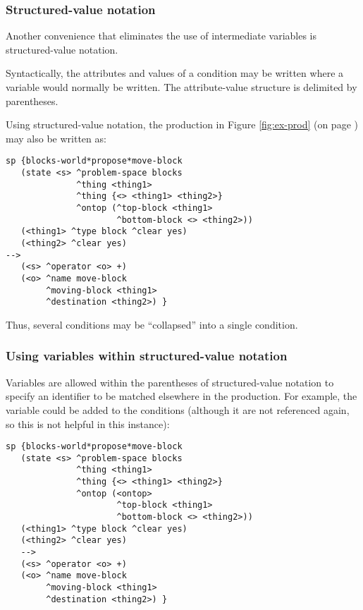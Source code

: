 \subsubsection{Structured-value notation}
\label{SYNTAX-pm-structured}    %

Another convenience that eliminates the use of intermediate variables is 
structured-value notation. 

Syntactically, the attributes and values of a condition may be written where a
variable would normally be written. The attribute-value structure is delimited
by parentheses.

Using structured-value notation, the production in Figure \ref{fig:ex-prod}
(on page \pageref{fig:ex-prod}) may also be written as:

\begin{verbatim}
sp {blocks-world*propose*move-block
   (state <s> ^problem-space blocks
              ^thing <thing1> 
              ^thing {<> <thing1> <thing2>}
              ^ontop (^top-block <thing1>
                      ^bottom-block <> <thing2>))
   (<thing1> ^type block ^clear yes)
   (<thing2> ^clear yes)
-->
   (<s> ^operator <o> +)
   (<o> ^name move-block
        ^moving-block <thing1>
        ^destination <thing2>) }
\end{verbatim}

Thus, several conditions may be ``collapsed'' into a single condition.


\subsubsection*{Using variables within structured-value notation}

Variables are allowed within the parentheses of structured-value notation to
specify an identifier to be matched elsewhere in the production. For example,
the variable  could be added to the conditions (although it are
not referenced again, so this is not helpful in this instance):

\begin{verbatim}
sp {blocks-world*propose*move-block
   (state <s> ^problem-space blocks
              ^thing <thing1> 
              ^thing {<> <thing1> <thing2>}
              ^ontop (<ontop> 
                      ^top-block <thing1>
                      ^bottom-block <> <thing2>))
   (<thing1> ^type block ^clear yes)
   (<thing2> ^clear yes)
   -->
   (<s> ^operator <o> +)
   (<o> ^name move-block
        ^moving-block <thing1>
        ^destination <thing2>) }
\end{verbatim}

